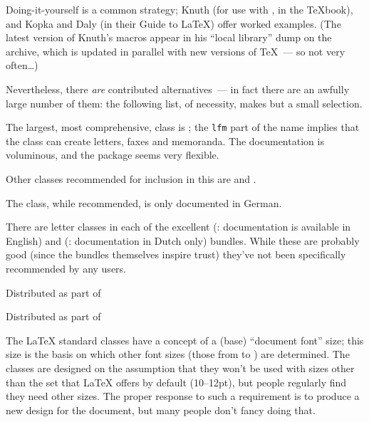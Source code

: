 Doing-it-yourself is a common strategy; Knuth (for use with
\plaintex{}, in the \TeX{}book), and Kopka and Daly (in their Guide to
\LaTeX{}) offer worked examples.  (The latest version of Knuth's
macros appear in his ``local library'' dump on the archive, which is
updated in parallel with new versions of \TeX{}~--- so not very often\dots{})

Nevertheless, there \emph{are} contributed alternatives~--- in fact
there are an awfully large number of them: the following list, of
necessity, makes but a small selection.

The largest, most comprehensive, class is ; the \texttt{lfm}
part of the name implies that the class can create letters, faxes and
memoranda.  The documentation is voluminous, and the package seems
very flexible.

Other classes recommended for inclusion in this  are
 and .

The  class, while recommended, is only documented in
German.

There are letter classes in each of the excellent
 (: documentation is available in
English) and  (: documentation in Dutch
only) bundles.  While these are probably good (since the bundles
themselves inspire trust) they've not been specifically recommended by
any users.
\begin{ctanrefs}
\item[akletter.cls]
\item[brief.cls]Distributed as part of 
\item[dinbrief.cls]
\item[isodoc.cls]
\item[\nothtml{\rmfamily}Knuth's letter.tex]
\item[newlfm.cls]
\item[scrlttr2.cls]Distributed as part of 
\end{ctanrefs}


The \LaTeX{} standard classes have a concept of a (base) ``document
font'' size; this size is the basis on which other font sizes (those
from  to ) are determined.  The classes are designed
on the assumption that they won't be used with sizes other than the
set that \LaTeX{} offers by default (10--12pt), but people regularly
find they need other sizes.  The proper response to such a requirement
is to produce a new design for the document, but many people don't
fancy doing that.

